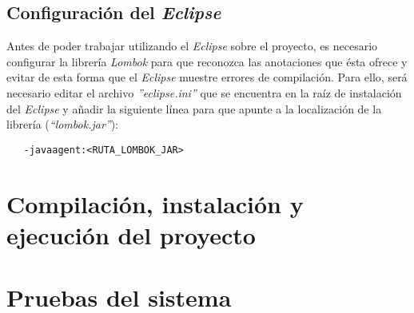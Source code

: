 \subsection{Configuración del \textit{Eclipse}}
Antes de  poder trabajar utilizando el \textit{Eclipse} sobre el proyecto, es necesario configurar la librería \textit{Lombok} para que reconozca las anotaciones que ésta ofrece y evitar de esta forma que el \textit{Eclipse} muestre errores de compilación. Para ello, será necesario editar el archivo \emph{''eclipse.ini''} que se encuentra en la raíz de instalación del \textit{Eclipse} y añadir la siguiente línea para que apunte a la localización de la librería (\emph{``lombok.jar''}):
\begin{verbatim}
   -javaagent:<RUTA_LOMBOK_JAR>
\end{verbatim}

\section{Compilación, instalación y ejecución del proyecto}




\section{Pruebas del sistema}
